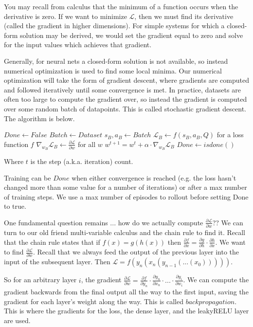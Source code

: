\documentclass[11pt]{article}
\begin{document}
You may recall from calculus that the minimum of a function occurs when the derivative is zero. If we want to minimize $\mathcal L$, then we must find its derivative (called the gradient in higher dimensions). For simple systems for which a closed-form solution may be derived, we would set the gradient equal to zero and solve for the input values which achieves that gradient. 

Generally, for neural nets a closed-form solution is not available, so instead numerical optimization is used to find some local minima. Our numerical optimization will take the form of gradient descent, where gradients are computed and followed iteratively until some convergence is met. In practice, datasets are often too large to compute the gradient over, so instead the gradient is computed over some random batch of datapoints. This is called stochastic gradient descent. The algorithm is below.

\begin{algorithmic}
\State $Done \gets False$
	\State $Batch \gets Dataset$
	\State $s_B, a_B \gets Batch$
	\State $\mathcal L_B \gets f(s_B, a_B, Q)$ for a loss function $f$
	\State $\nabla_{w_B} \mathcal L_B \gets \frac{\partial \mathcal L}{\partial w} $ for all $w$
	\State $w^{t+1} = w^t + \alpha \cdot \nabla_{w_B} \mathcal L_B$
	\State $Done \gets isdone()$
\EndWhile
\end{algorithmic}
Where $t$ is the step (a.k.a. iteration) count.

Training can be $Done$ when either convergence is reached (e.g. the loss hasn't changed more than some value for a number of iterations) or after a max number of training steps. We use a max number of episodes to rollout before setting Done to true.

One fundamental question remains ... how do we actually compute $\frac{\partial \mathcal L}{\partial w}$?? We can turn to our old friend multi-variable calculus and the chain rule to find it. Recall that the chain rule states that if $f(x) = g(h(x))$ then $\frac{\partial f}{\partial x} = \frac{\partial g}{\partial h} \cdot \frac{\partial h}{\partial x}$. We want to find $\frac{\partial \mathcal L}{\partial w}$. Recall that we always feed the output of the previous layer into the input of the subsequent layer. Then $\mathcal L = f(y_n(x_n(y_{n-1}(...(x_0)))))$. 

So for an arbitrary layer $i$, the gradient $\frac{\partial \mathcal L}{\partial w} = \frac{\partial f}{\partial y_n} \cdot \frac{\partial y_n}{\partial x_n} \cdot ... \cdot \frac{\partial y_i}{\partial w_i}$. We can compute the gradient backwards from the final output all the way to the first input, saving the gradient for each layer's weight along the way. This is called $backpropagation$. This is where the gradients for the loss, the dense layer, and the leakyRELU layer are used.
\end{document}
